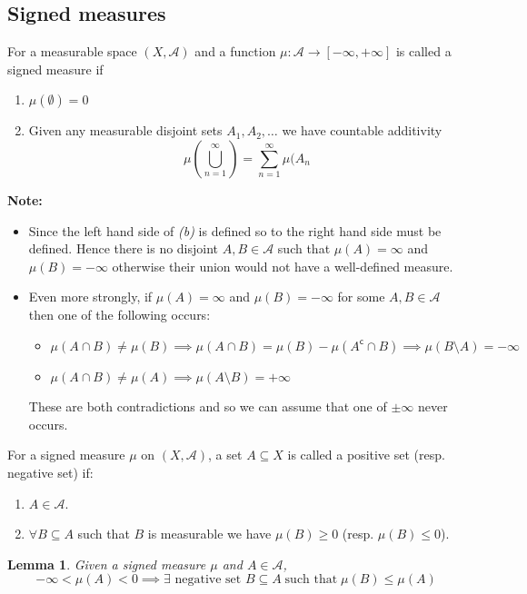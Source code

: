 \documentclass[11pt]{article}
\newcommand{\stcmp}{^{\mathsf{c}}}
\newenvironment{defin}
	{\begin{mdframed}[backgroundcolor=white, roundcorner=5pt, linewidth=1pt]}
	{\end{mdframed}}
\newcommand{\mdf}[1]{{\color{red} #1}}
\newenvironment{note}
	{\begin{mdframed}[backgroundcolor=white, linecolor=red, roundcorner=5pt, linewidth=1pt]\bfseries{Note:}\normalfont}
	{\end{mdframed}}
\newtheorem{lemma}[theorem]{Lemma}
\begin{document}
\subsection{Signed measures}
\begin{defin}
	For a measurable space $(X, \mathcal{A})$ and a function $\mu:\mathcal{A}\to[-\infty, +\infty]$ is called a \mdf{signed measure} if
	\begin{enumerate}[label=(\alph*)]
		\item $\mu(\emptyset)=0$
		\item Given any measurable disjoint sets $A_1, A_2, \dots$ we have countable additivity
			\[
				\mu\left(\bigcup_{n=1}^\infty\right)=\sum_{n=1}^{\infty}\mu(A_n
			\]
	\end{enumerate}
\end{defin}
\begin{note}
	\begin{itemize}
		\item Since the left hand side of \textit{(b)} is defined so to the right hand side must be defined.
			Hence there is no disjoint $A, B\in\mathcal{A}$ such that $\mu(A)=\infty$ and $\mu(B)=-\infty$ otherwise their union would not have a well-defined measure.
		\item Even more strongly, if $\mu(A)=\infty$ and $\mu(B)=-\infty$ for some $A, B\in\mathcal{A}$ then one of the following occurs:
			\begin{itemize}
				\item $\mu(A\cap B)\neq\mu(B) \implies \mu(A\cap B)=\mu(B)-\mu(A\stcmp\cap B) \implies \mu(B\setminus A)=-\infty$
				\item $\mu(A\cap B)\neq\mu(A) \implies \mu(A\setminus B)=+\infty$
			\end{itemize}
			These are both contradictions and so we can assume that one of $\pm\infty$ never occurs.
	\end{itemize}
\end{note}
\begin{defin}
	For a signed measure $\mu$ on $(X, \mathcal{A})$, a set $A\subseteq X$ is called a \mdf{positive set} (resp. \mdf{negative set}) if:
	\begin{enumerate}[label=(\roman*)]
		\item $A\in \mathcal{A}$.
		\item $\forall B\subseteq A$ such that $B$ is measurable we have $\mu(B)\geq 0$ (resp. $\mu(B)\leq 0$).
	\end{enumerate}
\end{defin}
\begin{lemma}
Given a signed measure $\mu$ and $A\in\mathcal{A}$,
\[
	-\infty < \mu(A) < 0 \implies \exists \text{ negative set } B\subseteq A \; \text{such that} \; \mu(B)\leq\mu(A)
\]
\end{lemma}
\end{document}
